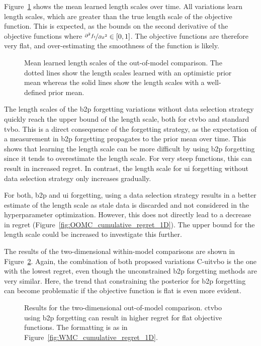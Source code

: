 Figure~\ref{fig:OOMC_lengthscales_1D} shows the mean learned length scales over time. All variations learn length scales, which are greater than the true length scale of the objective function. This is expected, as the bounds on the second derivative of the objective functions where $\nicefrac{\partial^2 f_t}{\partial x^2} \in [0, 1]$. The objective functions are therefore very flat, and over-estimating the smoothness of the function is likely.
\begin{figure}[h]
    \centering
    
    \caption[Learning the length scales in out-of-model comparison.]{Mean learned length scales of the out-of-model comparison. The dotted lines show the length scales learned with an optimistic prior mean whereas the solid lines show the length scales with a well-defined prior mean.}
    \label{fig:OOMC_lengthscales_1D}
\end{figure}

The length scales of the \gls{b2p} forgetting  variations without data selection strategy quickly reach the upper bound of the length scale, both for \gls{ctvbo} and standard \gls{tvbo}. This is a direct consequence of the forgetting strategy, as the expectation of a measurement in \gls{b2p} forgetting propagates to the prior mean over time. This shows that learning the length scale can be more difficult by using \gls{b2p} forgetting since it tends to overestimate the length scale. For very steep functions, this can result in increased regret. In contrast, the length scale for \gls{ui} forgetting without data selection strategy only increases gradually. 

For both, \gls{b2p} and \gls{ui} forgetting, using a data selection strategy results in a better estimate of the length scale as stale data is discarded and not considered in the hyperparameter optimization. However, this does not directly lead to a decrease in regret (Figure~\ref{fig:OOMC_cumulative_regret_1D}). The upper bound for the length scale could be increased to investigate this further.

The results of the two-dimensional within-model comparisons are shown in Figure~\ref{fig:OOMC_cumulative_regret_2D}. Again, the combination of both proposed variations C-\gls{uitvbo} is the one with the lowest regret, even though the unconstrained \gls{b2p} forgetting methods are very similar.
Here, the trend that constraining the posterior for \gls{b2p} forgetting can become problematic if the objective function is flat is even more evident.
\begin{figure}[h]
    \centering
    
    \caption[Results of the two-dimensional out-of-model comparison.]{Results for the two-dimensional out-of-model comparison. \gls{ctvbo} using \gls{b2p} forgetting can result in higher regret for flat objective functions. The formatting is as in Figure~\ref{fig:WMC_cumulative_regret_1D}.}
    \label{fig:OOMC_cumulative_regret_2D}
\end{figure}

